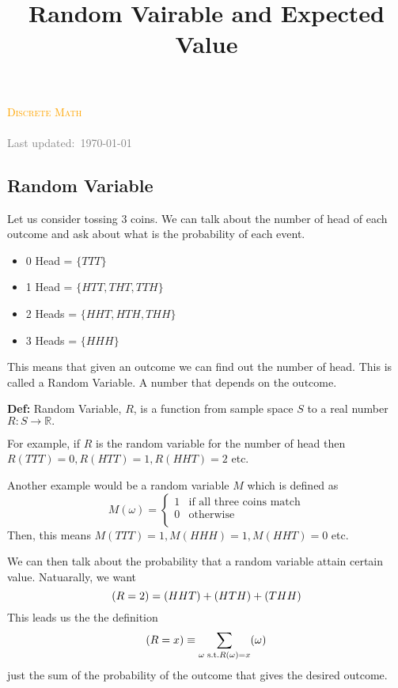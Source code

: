 \documentclass[a4paper, 12pt]{article}
\title{Random Vairable and Expected Value}
\newcommand{\real}{\mathbb{R}}
\newcommand{\definition}{\vspace{1em}\noindent\textbf{Def:} }
\let\Pr\relax
\DeclareMathOperator{\Pr}{Pr}
\newcommand{\course}{Discrete Math}
\begin{document}
\begin{center}
	\textcolor{orange}{\textsc{\course}}\\
	\huge\textbf{\textsc{\thetitle}}\\
	\small\textcolor{gray}{Last updated:\, \today \, \currenttime}\\
\end{center}


\begin{multicols}{2}
	
\section*{Random Variable}
Let us consider tossing 3 coins. We can talk about the number of head of each outcome and ask about what is the probability of each event.
\begin{itemize}
	\item 0 Head = $\{TTT\}$
	\item 1 Head = $\{HTT, THT, TTH\}$
	\item 2 Heads = $\{HHT, HTH, THH\}$
	\item 3 Heads = $\{HHH\}$
\end{itemize}

This means that given an outcome we can find out the number of head. This is called a Random Variable. A number that depends on the outcome.

\definition Random Variable, $R$, is a function from sample space $S$ to a real number $R:S\to \real.$

\vspace{1em}
For example, if $R$ is the random variable for the number of head then $R(TTT)=0, R(HTT)=1, R(HHT)=2$ etc.

Another example would be a random variable $M$ which is defined as
\begin{equation*}
	M(\omega) = \begin{cases*}
		1 & \text{if all three coins match}\\
		0 & \text{otherwise}\\
	\end{cases*}
\end{equation*}
Then, this means $M(TTT)=1, M(HHH)=1, M(HHT)=0$ etc.

We can then talk about the probability that a random variable attain certain value. Natuarally, we want
\[
	\Pr(R = 2) = \Pr(HHT) + \Pr(HTH) + \Pr(THH)
\]
This leads us the the definition
\[
	\Pr(R=x) \equiv \sum_{\omega \text{ s.t.} R(\omega) = x } \Pr(\omega)
\]
just the sum of the probability of the outcome that gives the desired outcome.


\end{multicols}
\end{document}
